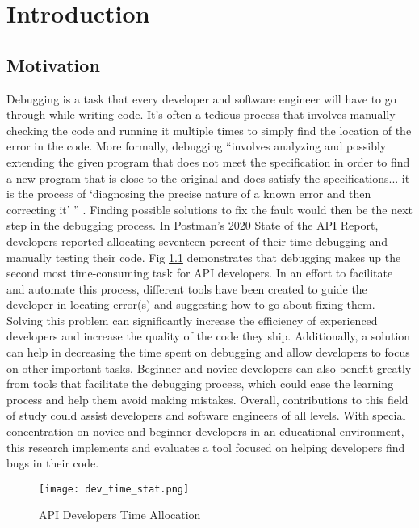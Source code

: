 \chapter{Introduction}
\label{ch:intro}

\section{Motivation}
\label{sec:motivation}

Debugging is a task that every developer and software engineer will have to go
through while writing code. It's often a
tedious process that involves manually checking the code and running it multiple
times to simply find the location of the error in the code. More formally,
debugging ``involves analyzing and possibly extending the given program that
does not meet the specification in order to find a new program that is close to
the original and does satisfy the specifications... it is the process of
`diagnosing the precise nature of a known error and then correcting it' '' \cite{Hailpern2002Debugging}.
Finding possible solutions to fix the fault would then be the next step
in the debugging process. In Postman's 2020 State of the API Report,
developers reported allocating seventeen percent of their time
debugging and manually testing their code.
Fig \ref{fig:development_time} demonstrates that debugging makes up the
second most time-consuming task for API developers.
In an effort to facilitate and automate this process, different tools have been
created to guide the developer in locating error(s) and suggesting how to go
about fixing them. Solving this problem can significantly increase the
efficiency of experienced developers and increase the quality of the code they
ship. Additionally, a solution can help in decreasing the time spent on
debugging and allow developers to focus on other important tasks.
Beginner and novice developers can also benefit greatly from tools
that facilitate the debugging process, which could ease the learning process and help
them avoid making mistakes. Overall, contributions to this field of study could
assist developers and software engineers of all levels.
With special concentration on novice and beginner developers in an educational
environment, this research implements and evaluates a tool focused on helping
developers find bugs in their code.

\begin{figure}[!htb]
	\begin{center}
		\texttt{[image: dev\_time\_stat.png]}
		\caption{\label{fig:development_time} API Developers Time Allocation}
	\end{center}
\end{figure}

